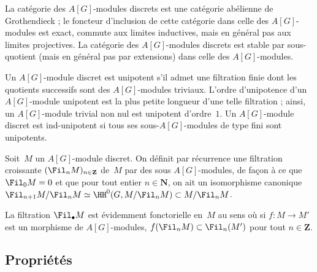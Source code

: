 \documentclass[10pt]{../fichiers-configuration-latex/smfart}
\begin{document}
La catégorie des $A[G]$-modules discrets est une catégorie abélienne de
Grothendieck ; le foncteur d'inclusion de cette
catégorie dans celle des $A[G]$-modules est exact, commute aux limites
inductives, mais en général pas aux limites projectives. La catégorie des
$A[G]$-modules discrets est stable par sous-quotient (mais en général pas
par extensions) dans celle des $A[G]$-modules.

\begin{definition2}
Un $A[G]$-module discret est unipotent s'il admet une filtration finie dont
les quotients successifs sont des $A[G]$-modules triviaux. L'ordre
d'unipotence d'un $A[G]$-module unipotent est la plus petite longueur d'une
telle filtration ; ainsi, un $A[G]$-module trivial non nul est unipotent
d'ordre $1$. Un $A[G]$-module discret est ind-unipotent si tous ses
sous-$A[G]$-modules de type fini sont unipotents.
\end{definition2}

\begin{definition2}\label{17-definition-filtration-unipotence}
Soit $M$ un $A[G]$-module discret. On définit par récurrence
une filtration croissante
$(\Fil_n M)_{n\in\mathbf{Z}}$ de $M$ par des sous $A[G]$-modules, de façon
à ce que $\Fil_0M=0$ et que pour tout entier $n\in\mathbf{N}$, on ait un
isomorphisme canonique $\Fil_{n+1}M/\Fil_nM\simeq \HH^0(G,M/\Fil_nM)\subset
M/\Fil_n M$.
\end{definition2}

La filtration $\Fil_\bullet M$ est évidemment fonctorielle en $M$ au sens
où si $f\colon M\to M'$ est un morphisme de $A[G]$-modules,
$f(\Fil_nM)\subset \Fil_n(M')$ pour tout $n\in\mathbf{Z}$.

\subsection{Propriétés}%
\end{document}
